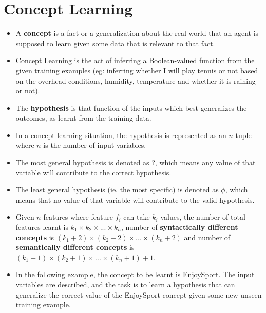 \documentclass{article}
\theoremstyle{plain}
\theoremstyle{definition}
\begin{document}
\section{Concept Learning}
\begin{itemize}
    \item A \textbf{concept} is a fact or a generalization about the real world that an agent is supposed to learn given some data that is relevant to that fact.
    
    \item Concept Learning is the act of inferring a Boolean-valued function from the given training examples (eg: inferring whether I will play tennis or not based on the overhead conditions, humidity, temperature and whether it is raining or not).
    
    \item The \textbf{hypothesis} is that function of the inputs which best generalizes the outcomes, as learnt from the training data. 
    
    \item In a concept learning situation, the hypothesis is represented as an $n$-tuple where $n$ is the number of input variables. 
    
    \item The most general hypothesis is denoted as ?, which means any value of that variable will contribute to the correct hypothesis. 
    
    \item The least general hypothesis (ie. the most specific) is denoted as $\phi$, which means that no value of that variable will contribute to the valid hypothesis.
    
    \item Given $n$ features where feature $f_i$ can take $k_i$ values, the number of total features learnt is $k_1 \times k_2 \times ... \times k_n$, number of \textbf{syntactically different concepts} is $(k_1+2) \times (k_2 + 2) \times ... \times (k_n+2)$ and number of \textbf{semantically different concepts} is $(k_1+1) \times (k_2 + 1) \times ... \times (k_n+1) + 1$. 
    
    \item In the following example, the concept to be learnt is EnjoySport. The input variables are described, and the task is to learn a hypothesis that can generalize the correct value of the EnjoySport concept given some new unseen training example.
\end{itemize}
\end{document}
